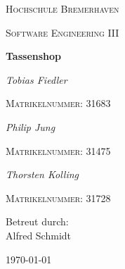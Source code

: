 \documentclass[12pt,a4paper]{report}
\begin{document}
\begin{titlepage}
	\centering
	{\scshape\LARGE Hochschule Bremerhaven \par}
	\vspace{1cm}
	{\scshape\Large Software Engineering III\par}
	\vspace{1.5cm}
	{\huge\bfseries Tassenshop\par}
	\vspace{2cm}
	{\Large\itshape Tobias Fiedler\par}
	\vspace{0.5cm}
	{\scshape Matrikelnummer: 31683\par}
	\vspace{0.8cm}
	{\Large\itshape Philip Jung\par}
	\vspace{0.5cm}
	{\scshape Matrikelnummer: 31475\par}
	\vspace{0.8cm}
	{\Large\itshape Thorsten Kolling\par}
	\vspace{0.5cm}
	{\scshape Matrikelnummer: 31728\par}
	\vfill
	Betreut durch:\\
	Alfred Schmidt
	\vfill

	{\large \today\par}
\end{titlepage}
\end{document}
